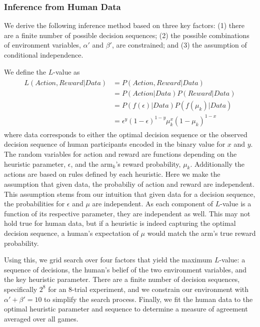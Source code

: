\subsubsection{Inference from Human Data}
We derive the following inference method based on three key factors: (1) there are a finite number of possible decision sequences; (2) the possible combinations of environment variables, $\alpha'$ and $\beta'$, are constrained; and (3) the assumption of conditional independence.

We define the $L$-value as 
\begin{align}
\begin{split}
	\label{eq:likelihood}
	L(Action,Reward|Data) &= P(Action,Reward|Data) \\
						  &= P(Action|Data) P(Reward|Data) \\
						  &= P(f(\epsilon)|Data) P(f(\mu_k)|Data) \\
						  &= \epsilon^y (1-\epsilon)^{1-y} \mu_k^x (1-\mu_k)^{1-x}
\end{split}
\end{align}
where data corresponds to either the optimal decision sequence or the observed decision sequence of human participants encoded in the binary value for $x$ and $y$. The random variables for action and reward are functions depending on the heuristic parameter, $\epsilon$, and the arm$_k$'s reward probability, $\mu_k$. Additionally the actions are based on rules defined by each heuristic. Here we make the assumption that given data, the probabiliy of action and reward are independent. This assumption stems from our intuition that given data for a decision sequence, the probabilities for $\epsilon$ and $\mu$ are independent. As each component of $L$-value is a function of its respective parameter, they are independent as well. This may not hold true for human data, but if a heuristic is indeed capturing the optimal decision sequence, a human's expectation of $\mu$ would match the arm's true reward probability.

Using this, we grid search over four factors that yield the maximum $L$-value: a sequence of decisions, the human's belief of the two environment variables, and the key heuristic parameter. There are a finite number of decision sequences, specifically $2^8$ for an 8-trial experiment, and we constrain our environment with $\alpha'+\beta'=10$ to simplify the search process. Finally, we fit the human data to the optimal heuristic parameter and sequence to determine a measure of agreement averaged over all games.


